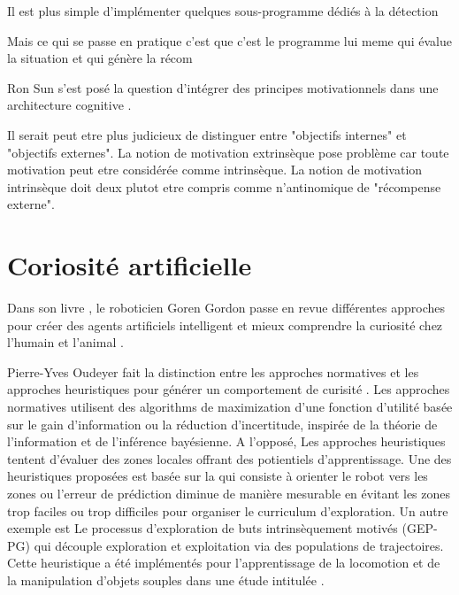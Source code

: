 Il est plus simple d'implémenter quelques sous-programme dédiés à la détection 

Mais ce qui se passe en pratique c'est que c'est le programme lui meme qui évalue la situation et qui génère la récom 

Ron Sun s'est posé la question d'intégrer des principes motivationnels dans une architecture cognitive \cite{sun_motivational_2009}.


Il serait peut etre plus judicieux de distinguer entre "objectifs internes" et "objectifs externes".
La notion de motivation extrinsèque pose problème car toute motivation peut etre considérée comme intrinsèque. 
La notion de motivation intrinsèque doit deux plutot etre compris comme n'antinomique de "récompense externe". 

\section{Coriosité artificielle}
\label{sec:curiosite}

Dans son livre , le roboticien Goren Gordon passe en revue différentes approches pour créer des agents artificiels intelligent et mieux comprendre la curiosité chez l'humain et l'animal \cite{gordon_new_2018}. 

Pierre-Yves Oudeyer fait la distinction entre les approches normatives et les approches heuristiques pour générer un comportement de curisité \cite{oudeyer_computational_2018}.
Les approches normatives utilisent des algorithms de maximization d'une fonction d'utilité basée sur le gain d'information ou la réduction d'incertitude, inspirée de la théorie de l'information et de l'inférence bayésienne.
A l'opposé, Les approches heuristiques tentent d'évaluer des zones locales offrant des potientiels d'apprentissage. 
Une des heuristiques proposées est basée sur la  qui consiste à orienter le robot vers les zones ou l'erreur de prédiction diminue de manière mesurable en évitant les zones trop faciles ou trop difficiles pour organiser le curriculum d'exploration.
Un autre exemple est Le processus d'exploration de buts intrinsèquement motivés (GEP-PG) qui découple exploration et exploitation via des populations de trajectoires. 
Cette heuristique a été  implémentés pour l'apprentissage de la locomotion et de la manipulation d'objets souples dans une étude intitulée  \cite{forestier_intrinsically_2022}. 

